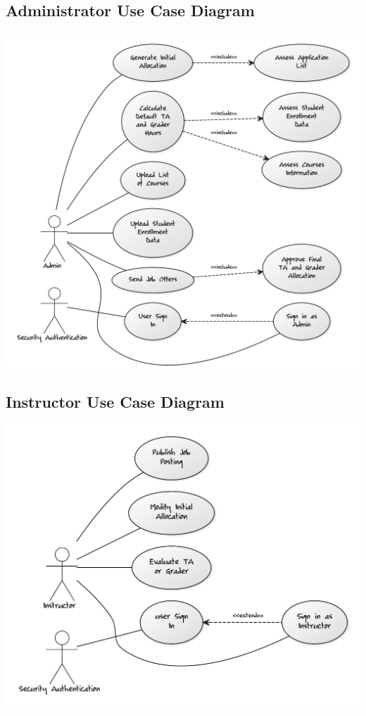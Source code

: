\documentclass[12pt]{report}
\begin{document}
\subsection{Administrator Use Case Diagram}
\includegraphics[scale=0.45]{model/Diagrams/UC/adminUC}
\subsection{Instructor Use Case Diagram}
\includegraphics[scale=0.5]{model/Diagrams/UC/instructorUC}
\end{document}
